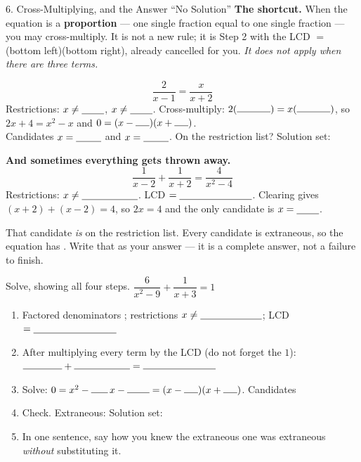 \documentclass[10pt]{article}
\begin{document}
\begin{notesbox}{6. Cross-Multiplying, and the Answer ``No Solution''}
\textbf{The shortcut.} When the equation is a \textbf{proportion} --- one single fraction equal to one
single fraction --- you may cross-multiply. It is not a new rule; it is Step 2 with the LCD
$=$ (bottom left)(bottom right), already cancelled for you. \emph{It does not apply when there are
three terms.}

\vspace{3pt}
\[ \frac{2}{x-1}=\frac{x}{x+2} \]
Restrictions: $x\neq\blank{0.8cm}$, $x\neq\blank{0.8cm}$. \; Cross-multiply:
$2(\rule{1.2cm}{0.4pt})=x(\rule{1.2cm}{0.4pt})$, so $2x+4=x^2-x$ and
$0=(x-\rule{0.5cm}{0.4pt})(x+\rule{0.5cm}{0.4pt})$. \\[3pt]
Candidates $x=\blank{0.9cm}$ and $x=\blank{0.9cm}$. On the restriction list? \blank{1.0cm} \;
Solution set: \blank{2.6cm}

\vspace{6pt}
\textbf{And sometimes everything gets thrown away.}
\[ \frac{1}{x-2}+\frac{1}{x+2}=\frac{4}{x^2-4} \]
Restrictions: $x\neq\blank{2.0cm}$. \; LCD $=\blank{2.6cm}$. \; Clearing gives
$(x+2)+(x-2)=4$, so $2x=4$ and the only candidate is $x=\blank{0.8cm}$.

\vspace{2pt}
That candidate \emph{is} on the restriction list. Every candidate is extraneous, so the equation has
\blank{2.6cm}. Write that as your answer --- it is a complete answer, not a failure to finish.
\end{notesbox}

\begin{practicebox}
Solve, showing all four steps. \; $\dfrac{6}{x^2-9}+\dfrac{1}{x+3}=1$
\begin{enumerate}[leftmargin=1.7em, itemsep=6pt]
  \item Factored denominators \blank{3.2cm}; \; restrictions $x\neq\blank{2.2cm}$; \;
        LCD $=\blank{3.0cm}$
  \item After multiplying every term by the LCD (do not forget the $1$):
        \; $\rule{1.4cm}{0.4pt}+\rule{2.0cm}{0.4pt}=\rule{2.6cm}{0.4pt}$
  \item Solve: \; $0=x^2-\rule{0.6cm}{0.4pt}\,x-\rule{0.8cm}{0.4pt}
        =(x-\rule{0.5cm}{0.4pt})(x+\rule{0.5cm}{0.4pt})$. \; Candidates \blank{2.4cm}
  \item Check. Extraneous: \blank{1.4cm} \; Solution set: \blank{2.0cm}
  \item In one sentence, say how you knew the extraneous one was extraneous \emph{without} substituting
        it. \writeline
\end{enumerate}
\end{practicebox}
\end{document}
